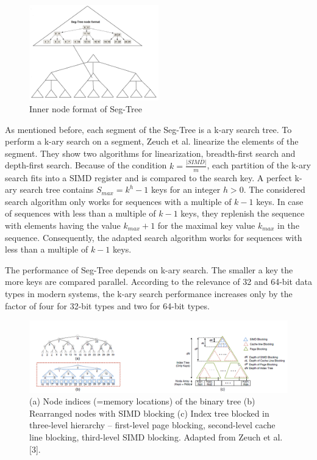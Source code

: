 \documentclass[conference]{IEEEtran}
\begin{document}
\begin{figure}
	\includegraphics[width=0.5\textwidth]{figure_2.png}
	\caption{Inner node format of Seg-Tree}
	\label{fig}
\end{figure}

As mentioned before, each segment of the Seg-Tree is a k-ary search tree. To perform a k-ary search on a segment, Zeuch et al. linearize the elements of the segment. They show two algorithms for linearization, breadth-first search and depth-first search. Because of the condition $k = \frac{\vert SIMD \vert }{m}$, each partition of the k-ary search fits into a SIMD register and is compared to the search key. A perfect k-ary search tree contains  $S_{max} = k^h - 1$ keys for an integer $h > 0$. The considered search algorithm only works for sequences with a multiple of $k-1$ keys. In case of  sequences with less than a multiple of $k-1$ keys, they replenish the sequence with elements having the value $k_{max} + 1$ for the maximal key value $k_{max}$ in the sequence. Consequently, the adapted search algorithm works for sequences with less than a multiple of $k-1$ keys.

The performance of Seg-Tree depends on k-ary search. The smaller a key the more keys are compared parallel. According to the relevance of 32 and 64-bit data types in modern systems, the k-ary search performance increases only by the factor of four for 32-bit types and two for 64-bit types.

\begin{figure}
	\includegraphics[width=1.0\textwidth]{figure_3.png}
	\caption{(a) Node indices (=memory locations) of the binary tree (b) Rearranged nodes with SIMD blocking (c) Index tree blocked in three-level
		hierarchy – first-level page blocking, second-level cache line blocking, third-level SIMD blocking. Adapted from Zeuch et al. [3].}
	\label{fig}
\end{figure}
\end{document}
